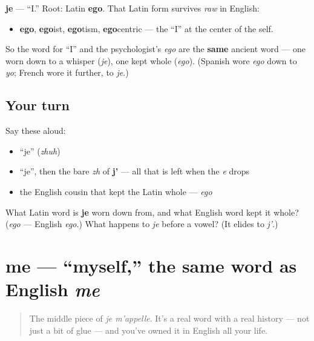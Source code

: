 \begin{cousinweb}
\textbf{je} — \textquotedblleft{}I.\textquotedblright{} Root: Latin \textbf{ego}. That Latin form survives \emph{raw} in English:

\begin{itemize}
\raggedright
  \item \textbf{ego}, \textbf{ego}ist, \textbf{ego}tism, \textbf{ego}centric — the \textquotedblleft{}I\textquotedblright{} at the center of the self.
\end{itemize}

So the word for \textquotedblleft{}I\textquotedblright{} and the psychologist's \emph{ego} are the \textbf{same} ancient word — one worn down to a whisper (\emph{je}), one kept whole (\emph{ego}). (Spanish wore \emph{ego} down to \emph{yo}; French wore it further, to \emph{je}.)
\end{cousinweb}

\subsection*{Your turn}
Say these aloud:

\begin{itemize}
\raggedright
  \item \textquotedblleft{}je\textquotedblright{} (\emph{zhuh})
  \item \textquotedblleft{}je\textquotedblright{}, then the bare \emph{zh} of \textbf{j'} — all that is left when the \emph{e} drops
  \item the English cousin that kept the Latin whole — \emph{ego}
\end{itemize}

\begin{tcolorbox}[breakable,colback=teal!4,colframe=teal!35!black,title={Before you move on}]
What Latin word is \textbf{je} worn down from, and what English word kept it whole? (\emph{ego} — English \emph{ego}.) What happens to \emph{je} before a vowel? (It elides to \emph{j'}.)
\end{tcolorbox}
\section[me]{me — \textquotedblleft{}myself,\textquotedblright{} the same word as English \emph{me}}

\label{lesson:FR-C02-me}



\begin{quote}
The middle piece of \emph{je m'appelle}. It's a real word with a real history — not just a bit of glue — and you've owned it in English all your life.
\end{quote}


